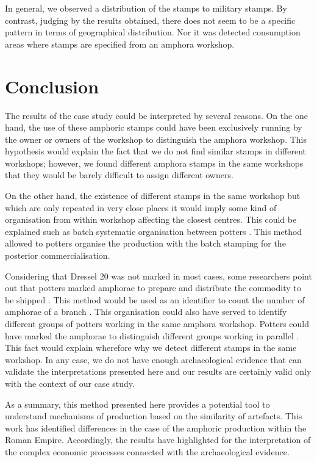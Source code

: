 \documentclass[review]{elsarticle}
\begin{document}
In general, we observed a distribution of the stamps to military stamps. By contrast, judging by the results obtained, there does not seem to be a specific pattern in terms of geographical distribution. Nor it was detected consumption areas where stamps are specified from an amphora workshop. 


\section{Conclusion}


The results of the case study could be interpreted by several reasons. On the one hand, the use of these amphoric stamps could have been exclusively running by the owner or owners of the workshop to distinguish the amphora workshop. This hypothesis would explain the fact that we do not find similar stamps in different workshops; however, we found different amphora stamps in the same workshops that they would be barely difficult to assign different owners.

On the other hand, the existence of different stamps in the same workshop but which are only repeated in very close places it would imply some kind of organisation from within workshop affecting the closest centres. This could be explained such as batch systematic organisation between potters \citep{juanmorostesis}. 
This method allowed to potters organise the production with the batch stamping for the posterior commercialisation.

Considering that Dressel 20 was not marked in most cases, some researchers point out that potters marked amphorae to prepare and distribute the commodity to be shipped \citep{berni_millet_epigrafianforica_2008}. This method would be used as an identifier to count the number of amphorae of a branch \citep{juanmorostesis}. This organisation could also have served to identify different groups of potters working in the same amphora workshop. Potters could have marked the amphorae to distinguish different groups working in parallel \citep{li_crossbows_2014}. This fact would explain wherefore why we detect different stamps in the same workshop. In any case, we do not have enough archaeological evidence that can validate the interpretations presented here and our results are certainly valid only with the context of our case study. 

As a summary, this method presented here provides a potential tool to understand mechanisms of production based on the similarity of artefacts. This work has identified differences in the case of the amphoric production within the Roman Empire. Accordingly, the results have highlighted for the interpretation of the complex economic processes connected with the archaeological evidence. 
\end{document}

